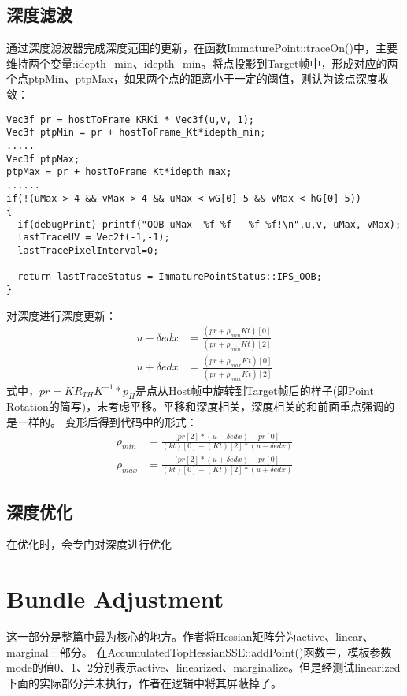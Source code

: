 \subsection{深度滤波}
通过深度滤波器完成深度范围的更新，在函数ImmaturePoint::traceOn()中，主要维持两个变量:idepth\_min、idepth\_min。将点投影到Target帧中，形成对应的两个点ptpMin、ptpMax，如果两个点的距离小于一定的阈值，则认为该点深度收敛：
\begin{lstlisting}[caption={  ImmaturePoint::traceOn()}]  
Vec3f pr = hostToFrame_KRKi * Vec3f(u,v, 1);
Vec3f ptpMin = pr + hostToFrame_Kt*idepth_min;		
.....
Vec3f ptpMax;
ptpMax = pr + hostToFrame_Kt*idepth_max;
......
if(!(uMax > 4 && vMax > 4 && uMax < wG[0]-5 && vMax < hG[0]-5))
{
  if(debugPrint) printf("OOB uMax  %f %f - %f %f!\n",u,v, uMax, vMax);
  lastTraceUV = Vec2f(-1,-1);
  lastTracePixelInterval=0;
  
  return lastTraceStatus = ImmaturePointStatus::IPS_OOB;
}
\end{lstlisting}  

\noindent 对深度进行深度更新：
\begin{equation}
\begin{aligned}
u-\delta e dx &= \frac{(pr + \rho_{min}Kt)[0]}{(pr + \rho_{min}Kt)[2]}\\
u+\delta e dx &= \frac{(pr + \rho_{max}Kt)[0]}{(pr + \rho_{max}Kt)[2]}
\end{aligned}
\end{equation}
式中，$pr=KR_{TH}K^{-1}*p_{H}$是点从Host帧中旋转到Target帧后的样子(即Point Rotation的简写)，未考虑平移。平移和深度相关，深度相关的和前面重点强调的是一样的。
变形后得到代码中的形式：
\begin{equation}
\begin{aligned}
\rho_{min}  &= \frac{(pr[2]*(u-\delta e dx)-pr[0]}{(kt)[0] - (Kt)[2]*(u-\delta e dx)}\\
\rho_{max}  &= \frac{(pr[2]*(u+\delta e dx)-pr[0]}{(kt)[0] - (Kt)[2]*(u+\delta e dx)}
\end{aligned}
\end{equation}

\subsection{深度优化}
在优化时，会专门对深度进行优化


\section{Bundle Adjustment}
\indent 这一部分是整篇中最为核心的地方。作者将Hessian矩阵分为active、linear、marginal三部分。
在AccumulatedTopHessianSSE::addPoint()函数中，模板参数mode的值0、1、2分别表示active、linearized、marginalize。但是经测试linearized下面的实际部分并未执行，作者在逻辑中将其屏蔽掉了。
